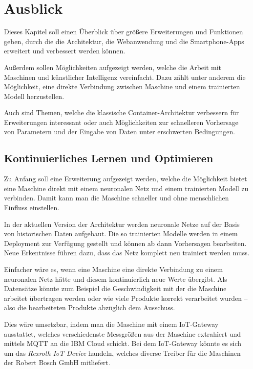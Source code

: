 \chapter{Ausblick}
\label{ch:ausblick}
Dieses Kapitel soll einen Überblick über größere Erweiterungen und Funktionen geben, durch die die Architektur, die
Webanwendung und die Smartphone-Apps erweitert und verbessert werden können.

Außerdem sollen Möglichkeiten aufgezeigt werden, welche die Arbeit mit Maschinen und künstlicher Intelligenz
vereinfacht. Dazu zählt unter anderem die Möglichkeit, eine direkte Verbindung zwischen Maschine und einem trainierten
Modell herzustellen.

Auch sind Themen, welche die klassische Container-Architektur verbessern für Erweiterungen interessant oder
auch Möglichkeiten zur schnelleren Vorhersage von Parametern und der Eingabe von Daten unter erschwerten Bedingungen.

\section{Kontinuierliches Lernen und Optimieren}
Zu Anfang soll eine Erweiterung aufgezeigt werden, welche die Möglichkeit bietet eine Maschine direkt mit einem
neuronalen Netz und einem trainierten Modell zu verbinden. Damit kann man die Maschine schneller und ohne menschlichen
Einfluss einstellen.

In der aktuellen Version der Architektur werden neuronale Netze auf der Basis von historischen Daten aufgebaut. Die so
trainierten Modelle werden in einem Deployment zur Verfügung gestellt und können ab dann Vorhersagen bearbeiten. Neue
Erkentnisse führen dazu, dass das Netz komplett neu trainiert werden muss.

Einfacher wäre es, wenn eine Maschine eine direkte Verbindung zu einem neuronalen Netz hätte und diesem kontinuierlich
neue Werte übergibt. Als Datensätze könnte zum Beispiel die Geschwindigkeit mit der die Maschine arbeitet übertragen
werden oder wie viele Produkte korrekt verarbeitet wurden -- also die bearbeiteten Produkte abzüglich dem Ausschuss.

Dies wäre umsetzbar, indem man die Maschine mit einem IoT-Gateway ausstattet, welches verschiedenste Messgrößen aus der
Maschine extrahiert und mittels MQTT an die IBM Cloud schickt. Bei dem IoT-Gateway könnte es sich um das
\textit{Rexroth IoT Device} handeln, welches diverse Treiber für die Maschinen der Robert Bosch GmbH mitliefert.

